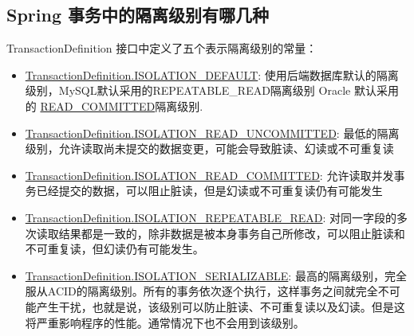 \documentclass[../../../interview-questions.tex]{subfiles}
\begin{document}
\subsection{Spring 事务中的隔离级别有哪几种}

TransactionDefinition 接口中定义了五个表示隔离级别的常量：

\begin{itemize}
    \item {\url{TransactionDefinition.ISOLATION\_DEFAULT}:  使用后端数据库默认的隔离级别，MySQL默认采用的REPEATABLE\_READ隔离级别 Oracle 默认采用的 \url{READ\_COMMITTED}隔离级别.}
    \item {\url{TransactionDefinition.ISOLATION\_READ\_UNCOMMITTED}: 最低的隔离级别，允许读取尚未提交的数据变更，可能会导致脏读、幻读或不可重复读}
    \item {\url{TransactionDefinition.ISOLATION\_READ\_COMMITTED}:   允许读取并发事务已经提交的数据，可以阻止脏读，但是幻读或不可重复读仍有可能发生}
    \item {\url{TransactionDefinition.ISOLATION\_REPEATABLE\_READ}:  对同一字段的多次读取结果都是一致的，除非数据是被本身事务自己所修改，可以阻止脏读和不可重复读，但幻读仍有可能发生。}
    \item {\url{TransactionDefinition.ISOLATION\_SERIALIZABLE}:   最高的隔离级别，完全服从ACID的隔离级别。所有的事务依次逐个执行，这样事务之间就完全不可能产生干扰，也就是说，该级别可以防止脏读、不可重复读以及幻读。但是这将严重影响程序的性能。通常情况下也不会用到该级别。}
\end{itemize}
\end{document}
